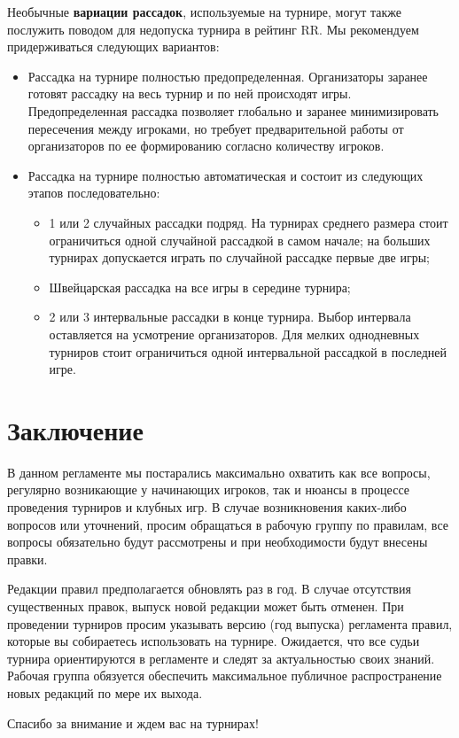 Необычные \textbf{вариации рассадок}, используемые на турнире, могут также послужить поводом для недопуска турнира в рейтинг RR. Мы рекомендуем придерживаться следующих вариантов:
\begin{itemize}
	\item Рассадка на турнире полностью предопределенная. Организаторы заранее готовят рассадку на весь турнир и по ней происходят игры. Предопределенная рассадка позволяет глобально и заранее минимизировать пересечения между игроками, но требует предварительной работы от организаторов по ее формированию согласно количеству игроков.
	\item Рассадка на турнире полностью автоматическая и состоит из следующих этапов последовательно:
	\begin{itemize}
		\item 1 или 2 случайных рассадки подряд. На турнирах среднего размера стоит ограничиться одной случайной рассадкой в самом начале; на больших турнирах допускается играть по случайной рассадке первые две игры;
		\item Швейцарская рассадка на все игры в середине турнира;
		\item 2 или 3 интервальные рассадки в конце турнира. Выбор интервала оставляется на усмотрение организаторов. Для мелких однодневных турниров стоит ограничиться одной интервальной рассадкой в последней игре.
	\end{itemize}
\end{itemize}

\newpage

\section{Заключение}

В данном регламенте мы постарались максимально охватить как все вопросы, регулярно возникающие у начинающих игроков, так и нюансы в процессе проведения турниров и клубных игр. В случае возникновения каких-либо вопросов или уточнений, просим обращаться в рабочую группу по правилам, все вопросы обязательно будут рассмотрены и при необходимости будут внесены правки.

Редакции правил предполагается обновлять раз в год. В случае отсутствия существенных правок, выпуск новой редакции может быть отменен. При проведении турниров просим указывать версию (год выпуска) регламента правил, которые вы собираетесь использовать на турнире. Ожидается, что все судьи турнира ориентируются в регламенте и следят за актуальностью своих знаний. Рабочая группа обязуется обеспечить максимальное публичное распространение новых редакций по мере их выхода.

Спасибо за внимание и ждем вас на турнирах!
